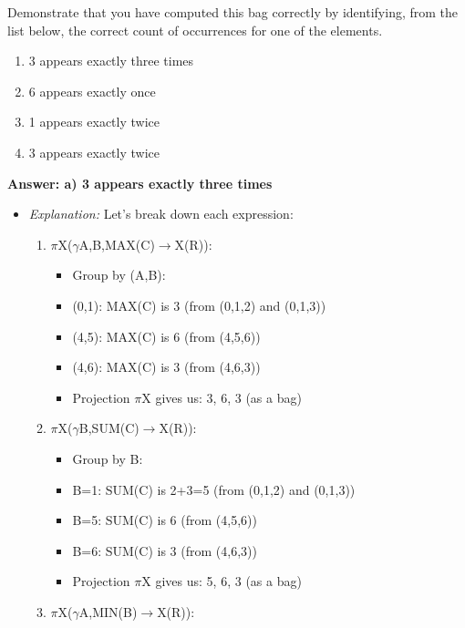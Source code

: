 \documentclass{article}
\begin{document}
\begin{enumerate}[label=\textbf{Question \arabic*.}]
        Demonstrate that you have computed this bag correctly by identifying, from the list below, the correct count of occurrences for one of the elements.
        \begin{enumerate}[label=\alph*)]
            \item 3 appears exactly three times
            \item 6 appears exactly once
            \item 1 appears exactly twice
            \item 3 appears exactly twice
        \end{enumerate}
        \textbf{Answer: a) 3 appears exactly three times}
        \begin{itemize}
            \item \textit{Explanation:} Let's break down each expression:
            \begin{enumerate}
                \item $\pi$X($\gamma$A,B,MAX(C)$\rightarrow$X(R)):
                    \begin{itemize}
                        \item Group by (A,B):
                            \item (0,1): MAX(C) is 3 (from (0,1,2) and (0,1,3))
                            \item (4,5): MAX(C) is 6 (from (4,5,6))
                            \item (4,6): MAX(C) is 3 (from (4,6,3))
                        \item Projection $\pi$X gives us: {3, 6, 3} (as a bag)
                    \end{itemize}
                \item $\pi$X($\gamma$B,SUM(C)$\rightarrow$X(R)):
                    \begin{itemize}
                        \item Group by B:
                            \item B=1: SUM(C) is 2+3=5 (from (0,1,2) and (0,1,3))
                            \item B=5: SUM(C) is 6 (from (4,5,6))
                            \item B=6: SUM(C) is 3 (from (4,6,3))
                        \item Projection $\pi$X gives us: {5, 6, 3} (as a bag)
                    \end{itemize}
                \item $\pi$X($\gamma$A,MIN(B)$\rightarrow$X(R)):

\end{enumerate}
\end{itemize}
\end{enumerate}
\end{document}
